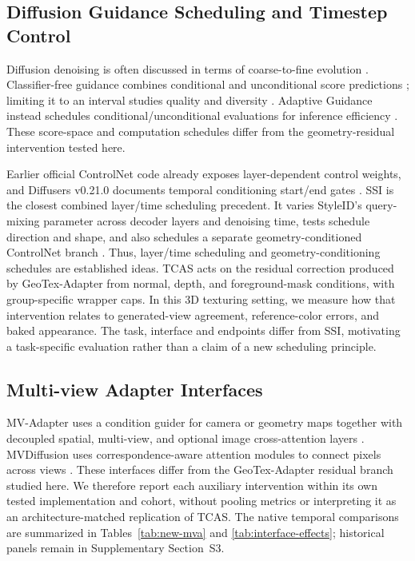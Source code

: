 \documentclass[times,twocolumn,final]{elsarticle}
\begin{document}
\subsection{Diffusion Guidance Scheduling and Timestep Control}
\label{subsec:guidance}

Diffusion denoising is often discussed in terms of coarse-to-fine evolution \cite{ho2020ddpm,song2021ddim}. Classifier-free guidance combines conditional and unconditional score predictions \cite{ho2022cfg}; limiting it to an interval studies quality and diversity \cite{kynkanniemi2024limited}. Adaptive Guidance instead schedules conditional/unconditional evaluations for inference efficiency \cite{castillo2023adaptive}. These score-space and computation schedules differ from the geometry-residual intervention tested here.

Earlier official ControlNet code already exposes layer-dependent control weights, and Diffusers v0.21.0 documents temporal conditioning start/end gates \cite{controlnet2023layercontrol,diffusers2023controlnet}. SSI is the closest combined layer/time scheduling precedent. It varies StyleID's query-mixing parameter \cite{chung2024styleid} across decoder layers and denoising time, tests schedule direction and shape, and also schedules a separate geometry-conditioned ControlNet branch \cite{kulkarni2026ssi}. Thus, layer/time scheduling and geometry-conditioning schedules are established ideas. TCAS acts on the residual correction produced by GeoTex-Adapter from normal, depth, and foreground-mask conditions, with group-specific wrapper caps. In this 3D texturing setting, we measure how that intervention relates to generated-view agreement, reference-color errors, and baked appearance. The task, interface and endpoints differ from SSI, motivating a task-specific evaluation rather than a claim of a new scheduling principle.

\subsection{Multi-view Adapter Interfaces}
\label{subsec:mvinterfaces}

MV-Adapter uses a condition guider for camera or geometry maps together with decoupled spatial, multi-view, and optional image cross-attention layers \cite{huang2024mvadapter}. MVDiffusion uses correspondence-aware attention modules to connect pixels across views \cite{tang2023mvdiffusion}. These interfaces differ from the GeoTex-Adapter residual branch studied here. We therefore report each auxiliary intervention within its own tested implementation and cohort, without pooling metrics or interpreting it as an architecture-matched replication of TCAS. The native temporal comparisons are summarized in Tables~\ref{tab:new-mva} and \ref{tab:interface-effects}; historical panels remain in Supplementary Section~S3.
\end{document}
